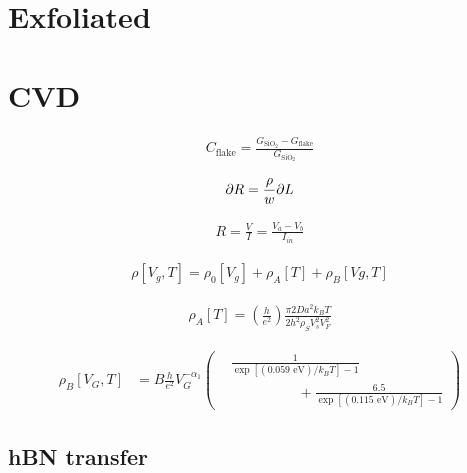 \documentclass[../Matt_Gebert_Honours_Thesis.tex]{subfiles}
\begin{document}
\section{Exfoliated}\label{sec:pristine_exfoliated}



\section{CVD}\label{sec:pristine_cvd}

\begin{align}
	C_{\text{flake}} = \frac{G_{\text{SiO}_2}-G_{\text{flake}}}{G_{\text{SiO}_2}}
\end{align}

\begin{align}
	\partial R = \frac{\rho}{w} \partial L
\end{align}

\begin{align}
	R = \frac{V}{I} = \frac{V_a-V_b}{I_{in}}
\end{align}


\begin{align}
	\rho[V_g,T] = \rho_0[V_g] + \rho_A[T] + \rho_B[Vg,T]
\end{align}

\begin{align}
	\rho_A[T] = \left(\frac{h}{e^2}\right) \frac{\pi2 Da^2 k_B T}{2 h^2 \rho_S V_s^2 V_F^2}
\end{align}

\begin{align}
\rho_B[V_G,T]&= B \frac{h}{e^2} V_G^{-\alpha_1} \left(\begin{aligned}
&\frac{1}{\exp\left[(0.059\text{ eV})/k_B T\right]-1}\\ &\hspace{2cm}+\frac{6.5}{\exp\left[(0.115\text{ eV})/k_B T\right]-1}
\end{aligned}\right)
\end{align}

\subsection{hBN transfer}
\end{document}
